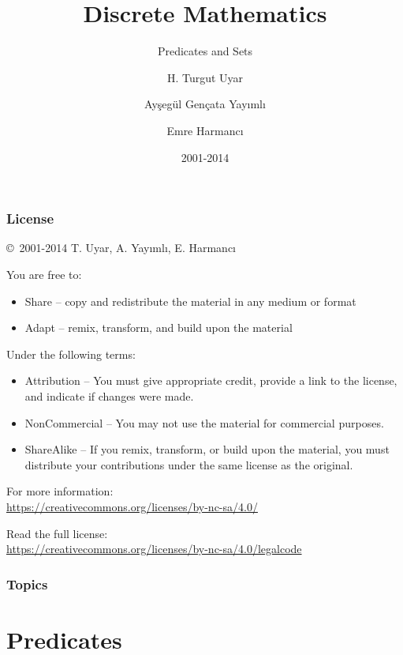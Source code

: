 \documentclass[dvipsnames]{beamer}
\title{Discrete Mathematics}
\subtitle{Predicates and Sets}
\author{H. Turgut Uyar \and Ayşegül Gençata Yayımlı \and Emre Harmancı}
\date{2001-2014}
\begin{document}
\begin{frame}
  \titlepage
\end{frame}

\begin{frame}
  \frametitle{License}

  \hfill
  \copyright~2001-2014 T. Uyar, A. Yayımlı, E. Harmancı

  \vfill
  \begin{footnotesize}
    You are free to:
    \begin{itemize}
      \itemsep0em
      \item Share -- copy and redistribute the material in any medium or format
      \item Adapt -- remix, transform, and build upon the material
    \end{itemize}

    Under the following terms:
    \begin{itemize}
      \itemsep0em
      \item Attribution -- You must give appropriate credit, provide a link to
        the license, and indicate if changes were made.

      \item NonCommercial -- You may not use the material for commercial
        purposes.

      \item ShareAlike -- If you remix, transform, or build upon the material,
        you must distribute your contributions under the same license as the
        original.
    \end{itemize}
  \end{footnotesize}

  \begin{small}
    For more information:\\
    \url{https://creativecommons.org/licenses/by-nc-sa/4.0/}

    \smallskip
    Read the full license:\\
    \url{https://creativecommons.org/licenses/by-nc-sa/4.0/legalcode}
  \end{small}
\end{frame}

\begin{frame}
  \frametitle{Topics}
  \tableofcontents
\end{frame}

\section{Predicates}
\end{document}
